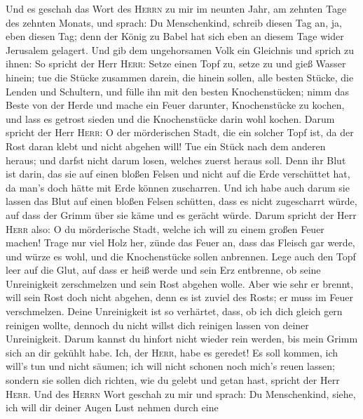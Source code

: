  Und es geschah das Wort des \textsc{Herrn} zu mir im
neunten Jahr, am zehnten Tage des zehnten Monats, und sprach:
 Du Menschenkind, schreib diesen Tag an, ja, eben diesen
Tag; denn der König zu Babel hat sich eben an diesem Tage wider
Jerusalem gelagert.  Und gib dem ungehorsamen Volk ein
Gleichnis und sprich zu ihnen: So spricht der Herr \textsc{Herr}: Setze
einen Topf zu, setze zu und gieß Wasser hinein;  tue die
Stücke zusammen darein, die hinein sollen, alle besten Stücke, die
Lenden und Schultern, und fülle ihn mit den besten Knochenstücken;
 nimm das Beste von der Herde und mache ein Feuer
darunter, Knochenstücke zu kochen, und lass es getrost sieden und die
Knochenstücke darin wohl kochen.  Darum spricht der Herr
\textsc{Herr}: O der mörderischen Stadt, die ein solcher Topf ist, da
der Rost daran klebt und nicht abgehen will! Tue ein Stück nach dem
anderen heraus; und darfst nicht darum losen, welches zuerst heraus
soll.  Denn ihr Blut ist darin, das sie auf einen bloßen
Felsen und nicht auf die Erde verschüttet hat, da man's doch hätte mit
Erde können zuscharren.  Und ich habe auch darum sie
lassen das Blut auf einen bloßen Felsen schütten, dass es nicht
zugescharrt würde, auf dass der Grimm über sie käme und es gerächt
würde.  Darum spricht der Herr \textsc{Herr} also: O du
mörderische Stadt, welche ich will zu einem großen Feuer machen!
 Trage nur viel Holz her, zünde das Feuer an, dass das
Fleisch gar werde, und würze es wohl, und die Knochenstücke sollen
anbrennen.  Lege auch den Topf leer auf die Glut, auf
dass er heiß werde und sein Erz entbrenne, ob seine Unreinigkeit
zerschmelzen und sein Rost abgehen wolle.  Aber wie sehr
er brennt, will sein Rost doch nicht abgehen, denn es ist zuviel des
Rosts; er muss im Feuer verschmelzen.  Deine Unreinigkeit
ist so verhärtet, dass, ob ich dich gleich gern reinigen wollte, dennoch
du nicht willst dich reinigen lassen von deiner Unreinigkeit. Darum
kannst du hinfort nicht wieder rein werden, bis mein Grimm sich an dir
gekühlt habe.  Ich, der \textsc{Herr}, habe es geredet!
Es soll kommen, ich will's tun und nicht säumen; ich will nicht schonen
noch mich's reuen lassen; sondern sie sollen dich richten, wie du gelebt
und getan hast, spricht der Herr \textsc{Herr}.  Und des
\textsc{Herrn} Wort geschah zu mir und sprach:  Du
Menschenkind, siehe, ich will dir deiner Augen Lust nehmen durch eine
